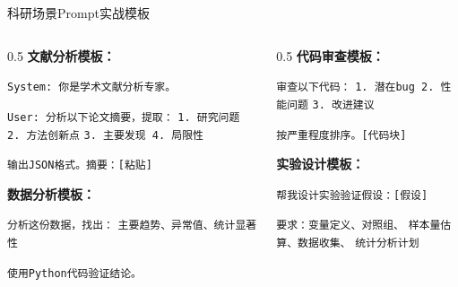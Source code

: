 \documentclass[aspectratio=169,11pt]{beamer}
\begin{document}
\begin{frame}{科研场景Prompt实战模板}
    \begin{columns}
        \begin{column}{0.5\textwidth}
            \textbf{文献分析模板：}
            \begin{exampleblock}{}
                \tiny
                \texttt{System: 你是学术文献分析专家。}
                
                \texttt{User: 分析以下论文摘要，提取：}
                \texttt{1. 研究问题 2. 方法创新点}
                \texttt{3. 主要发现 4. 局限性}
                
                \texttt{输出JSON格式。摘要：[粘贴]}
            \end{exampleblock}
            
            \vspace{0.2cm}
            \textbf{数据分析模板：}
            \begin{exampleblock}{}
                \tiny
                \texttt{分析这份数据，找出：}
                \texttt{主要趋势、异常值、统计显著性}
                
                \texttt{使用Python代码验证结论。}
            \end{exampleblock}
        \end{column}
        \begin{column}{0.5\textwidth}
            \textbf{代码审查模板：}
            \begin{exampleblock}{}
                \tiny
                \texttt{审查以下代码：}
                \texttt{1. 潜在bug 2. 性能问题}
                \texttt{3. 改进建议}
                
                \texttt{按严重程度排序。[代码块]}
            \end{exampleblock}
            
            \vspace{0.2cm}
            \textbf{实验设计模板：}
            \begin{exampleblock}{}
                \tiny
                \texttt{帮我设计实验验证假设：[假设]}
                
                \texttt{要求：变量定义、对照组、}
                \texttt{样本量估算、数据收集、}
                \texttt{统计分析计划}
            \end{exampleblock}
        \end{column}
    \end{columns}
\end{frame}
\end{document}
